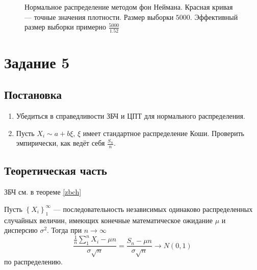 \documentclass[12pt, a4paper]{article}
\begin{document}
\begin{figure}[H]
\begin{center}
\end{center}
\caption{Нормальное распределение методом фон Неймана. Красная кривая --- точные значения плотности. Размер выборки $5000$. Эффективный размер выборки примерно $\frac{5000}{1.52}$}
\end{figure}

\newpage

\section{Задание 5}
\subsection{Постановка}
\begin{enumerate}
\item Убедиться в справедливости ЗБЧ и ЦПТ для нормального распределения.
\item Пусть $X_i \sim a+b\xi$, $\xi$ имеет стандартное распределение Коши. Проверить эмпирически, как ведёт себя $\frac{S_n}{n}$.
\end{enumerate}
\subsection{Теоретическая часть}
ЗБЧ см. в теореме \ref{zbch}

\begin{theorem}
Пусть $\left\{X_i\right\}_1^\infty$ --- последовательность независимых одинаково распределенных случайных величин, имеющих конечные математическое ожидание $\mu$ и дисперсию $\sigma^2$. Тогда при $n\to\infty$
\[ \frac{\frac{1}{n} \sum\limits_1^n X_i - \mu n}{\sigma \sqrt{n}} = \frac{S_n - \mu n}{\sigma \sqrt{n}} \to N(0,1)\]
по распределению.
\end{theorem}
\end{document}

